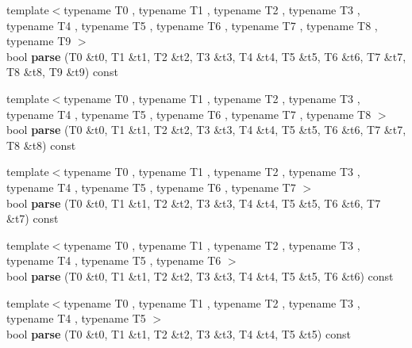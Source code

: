 \begin{DoxyCompactItemize}
\item 
\hypertarget{classstrtk_1_1token__grid_1_1row__type_aad471c6de83869088dcda881250123b8}{{\footnotesize template$<$typename T0 , typename T1 , typename T2 , typename T3 , typename T4 , typename T5 , typename T6 , typename T7 , typename T8 , typename T9 $>$ }\\bool {\bfseries parse} (T0 \&t0, T1 \&t1, T2 \&t2, T3 \&t3, T4 \&t4, T5 \&t5, T6 \&t6, T7 \&t7, T8 \&t8, T9 \&t9) const }\label{classstrtk_1_1token__grid_1_1row__type_aad471c6de83869088dcda881250123b8}

\item 
\hypertarget{classstrtk_1_1token__grid_1_1row__type_ae24e3a18699ea19d410181978874171d}{{\footnotesize template$<$typename T0 , typename T1 , typename T2 , typename T3 , typename T4 , typename T5 , typename T6 , typename T7 , typename T8 $>$ }\\bool {\bfseries parse} (T0 \&t0, T1 \&t1, T2 \&t2, T3 \&t3, T4 \&t4, T5 \&t5, T6 \&t6, T7 \&t7, T8 \&t8) const }\label{classstrtk_1_1token__grid_1_1row__type_ae24e3a18699ea19d410181978874171d}

\item 
\hypertarget{classstrtk_1_1token__grid_1_1row__type_a5e8d1e7ffad0ba35130364450ed782b8}{{\footnotesize template$<$typename T0 , typename T1 , typename T2 , typename T3 , typename T4 , typename T5 , typename T6 , typename T7 $>$ }\\bool {\bfseries parse} (T0 \&t0, T1 \&t1, T2 \&t2, T3 \&t3, T4 \&t4, T5 \&t5, T6 \&t6, T7 \&t7) const }\label{classstrtk_1_1token__grid_1_1row__type_a5e8d1e7ffad0ba35130364450ed782b8}

\item 
\hypertarget{classstrtk_1_1token__grid_1_1row__type_a294c52872e3e2e5c62a77b5231c8669a}{{\footnotesize template$<$typename T0 , typename T1 , typename T2 , typename T3 , typename T4 , typename T5 , typename T6 $>$ }\\bool {\bfseries parse} (T0 \&t0, T1 \&t1, T2 \&t2, T3 \&t3, T4 \&t4, T5 \&t5, T6 \&t6) const }\label{classstrtk_1_1token__grid_1_1row__type_a294c52872e3e2e5c62a77b5231c8669a}

\item 
\hypertarget{classstrtk_1_1token__grid_1_1row__type_ac957a38f1b6c1e808fb3c5051b937575}{{\footnotesize template$<$typename T0 , typename T1 , typename T2 , typename T3 , typename T4 , typename T5 $>$ }\\bool {\bfseries parse} (T0 \&t0, T1 \&t1, T2 \&t2, T3 \&t3, T4 \&t4, T5 \&t5) const }\label{classstrtk_1_1token__grid_1_1row__type_ac957a38f1b6c1e808fb3c5051b937575}


\end{DoxyCompactItemize}
